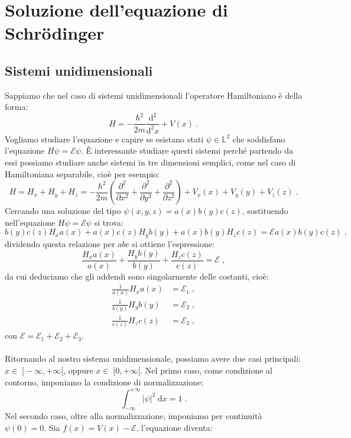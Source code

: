 \documentclass[10pt,a4paper]{report}
\theoremstyle{definition}
\numberwithin{equation}{section}
\newcommand{\diff}[1][]{\mathrm{d}#1}
\begin{document}
\chapter{Soluzione dell'equazione di Schrödinger}
\section{Sistemi unidimensionali}
Sappiamo che nel caso di sistemi unidimensionali l'operatore Hamiltoniano è della forma:
\begin{equation}
H=-\frac{\hbar^2}{2m}\frac{\mathrm{d}^2}{\diff^2{x}}+V(x)\;.
\end{equation}
Vogliamo studiare l'equazione e capire se esistano stati $\psi\in\mathbb{L}^2$ che soddisfano l'equazione $H\psi=\mathcal{E}\psi$. È interessante studiare questi sistemi perché partendo da essi possiamo studiare anche sistemi in tre dimensioni semplici, come nel caso di Hamiltoniana separabile, cioè per esempio:
\begin{equation}
H=H_x+H_y+H_z=-\frac{\hbar^2}{2m}\left(\frac{\partial^2}{\partial x^2}+\frac{\partial^2}{\partial y^2}+\frac{\partial^2}{\partial z^2}\right)+V_x(x)+V_y(y)+V_z(z)\;.
\end{equation}
Cercando una soluzione del tipo $\psi(x,y,z)=a(x)b(y)c(z)$, sostituendo nell'equazione $H\psi=\mathcal{E}\psi$ si trova:
$$
b(y)c(z)H_x a(x)+a(x)c(z)H_y b(y)+a(x)b(y)H_z c(z)=\mathcal{E}a(x)b(y)c(z)\;,
$$
dividendo questa relazione per $abc$ si ottiene l'espressione:
\begin{equation}
\frac{H_x a(x)}{a(x)}+\frac{H_y b(y)}{b(y)}+\frac{H_z c(z)}{c(z)}=\mathcal{E}\;,
\end{equation}
da cui deduciamo che gli addendi sono singolarmente delle costanti, cioè:
\begin{align*}
\frac{1}{a(x)}H_xa(x) &=\mathcal{E}_1\;, \\
\frac{1}{b(y)}H_yb(y) &=\mathcal{E}_2\;, \\
\frac{1}{c(z)}H_zc(z) &= \mathcal{E}_3\;,
\end{align*}
con $\mathcal{E}=\mathcal{E}_1+\mathcal{E}_2+\mathcal{E}_3$. \\
\\
Ritornando al nostro sistema unidimensionale, possiamo avere due casi principali: $x\in\;]-\infty,+\infty[$, oppure $x\in\;[0,+\infty[$. Nel primo caso, come condizione al contorno, imponiamo la condizione di normalizzazione:
$$
\int_{-\infty}^{+\infty} |\psi|^2\;\diff{x}=1\;.
$$
Nel secondo caso, oltre alla normalizzazione, imponiamo per continuità $\psi(0)=0$. Sia $f(x)=V(x)-\mathcal{E}$, l'equazione diventa:
\end{document}
